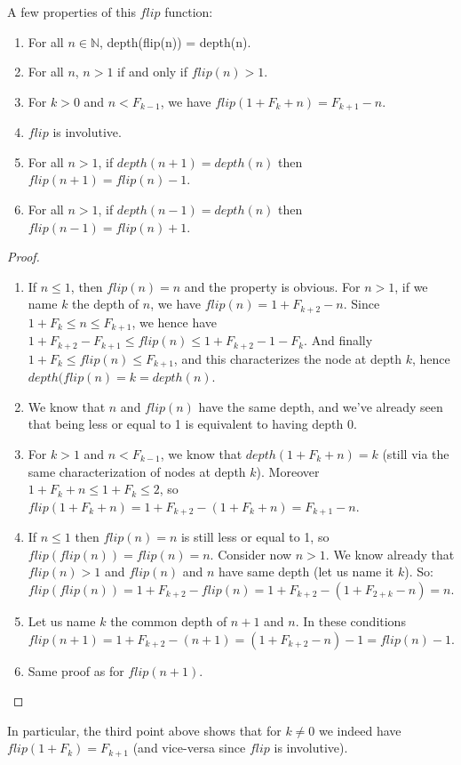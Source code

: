 \documentclass[a4paper,11pt]{article}
\begin{document}
A few properties of this $flip$ function:
\begin{theorem}\label{flipprops}
\noindent
\begin{enumerate}
\item For all $n\in\mathbb{N}$, depth(flip(n)) = depth(n).
\item For all $n$, $n>1$ if and only if $flip(n)>1$.
\item For $k>0$ and $n<F_{k-1}$, we have
 $flip(1+F_k+n) = F_{k+1}-n$.
\item $flip$ is involutive.
\item For all $n>1$, if $depth(n+1)=depth(n)$ then
  $flip(n+1)=flip(n)-1$.
\item For all $n>1$, if $depth(n-1)=depth(n)$ then
  $flip(n-1)=flip(n)+1$.
\end{enumerate}
\end{theorem}
\begin{proof}
\noindent
\begin{enumerate}
\item If $n\le 1$, then $flip(n)=n$ and the property is obvious.
For $n>1$, if we name $k$ the depth of $n$, we have
$flip(n) = 1+F_{k+2}-n$. Since $1+F_k \le n \le F_{k+1}$,
we hence have $1+F_{k+2}-F_{k+1} \le flip(n) \le 1+F_{k+2}-1-F_k$.
And finally $1+F_k \le flip(n) \le F_{k+1}$, and this characterizes
the node at depth $k$, hence $depth(flip(n)=k=depth(n)$.
\item We know that $n$ and $flip(n)$ have the same depth, and
we've already seen that being less or equal to 1 is equivalent
to having depth 0.
\item For $k>1$ and $n<F_{k-1}$, we know that $depth(1+F_k+n)=k$
(still via the same characterization of nodes at depth $k$).
Moreover $1+F_k+n \le 1+F_k \le 2$, so
$flip(1+F_k+n) = 1+F_{k+2}-(1+F_k+n) = F_{k+1}-n$.
\item If $n\le 1$ then $flip(n)=n$ is still less or equal to 1,
so $flip(flip(n))=flip(n)=n$.
Consider now $n>1$. We know already that $flip(n)>1$ and
$flip(n)$ and $n$ have same depth (let us name it $k$). So:
$flip(flip(n)) = 1+F_{k+2}-flip(n)=1+F_{k+2}-(1+F_{2+k}-n) = n$.
\item Let us name $k$ the common depth of $n+1$ and $n$.
In these conditions
$flip(n+1) = 1+F_{k+2}-(n+1) = (1+F_{k+2}-n)-1 = flip(n)-1$.
\item Same proof as for $flip(n+1)$.
\end{enumerate}
\end{proof}

In particular, the third point above shows that for $k\neq 0$
we indeed have $flip(1+F_k) = F_{k+1}$ (and vice-versa since $flip$
is involutive).
\end{document}
